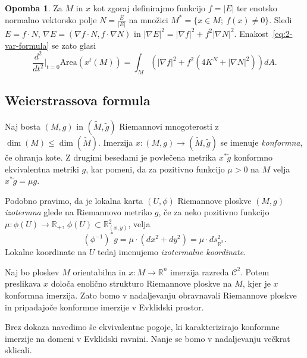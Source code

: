 \documentclass[12pt,a4paper,twoside]{article}
\theoremstyle{definition} %
\newtheorem{opomba}[definicija]{Opomba}
\theoremstyle{plain} %
\numberwithin{equation}{section}  %
\newcommand{\R}{\mathbb R}
\begin{document}
\begin{opomba}
Za $M$ in $x$ kot zgoraj definirajmo funkcijo $f = |E|$ ter enotsko normalno vektorsko polje $N = \frac{E}{|E|}$ na množici $M^{*} = \{ x \in M ; \ f(x) \neq 0 \}$. Sledi $E = f \cdot N$, $\nabla E = (\nabla f \cdot N, f \cdot \nabla N)$ in $|\nabla E|^2 = |\nabla f|^2 + f^2 |\nabla N|^2$.
Enakost~\eqref{eq:2-var-formula} se zato glasi
\begin{equation}
\frac{d^2}{dt^2} \Big|_{t=0} \text{Area} \left(x^{t}(M)\right) = \int_{M} {\left( |\nabla f|^2 + f^2 (4K^{N} + |\nabla N|^2) \right) dA}.
\end{equation}
\end{opomba}

\subsection{Weierstrassova formula}
%
Naj bosta $(M,g)$ in $(\widetilde{M},\tilde{g})$ Riemannovi mnogoterosti z $\dim(M) \leq \dim(\widetilde{M})$.
Imerzija $x \colon (M,g) \to (\widetilde{M}, \tilde{g})$ se imenuje \emph{konformna}, če ohranja kote.
Z drugimi besedami je povlečena metrika $x^{*}\tilde{g}$ konformno ekvivalentna metriki $g$, kar pomeni, da za pozitivno funkcijo $\mu > 0$ na $M$ velja $x^{*}\tilde{g} = \mu g$.

Podobno pravimo, da je lokalna karta $(U, \phi)$ Riemannove ploskve $(M,g)$ \emph{izotermna} glede na Riemannovo metriko $g$, če za neko pozitivno funkcijo $\mu \colon \phi(U) \to \mathbb{R}_{+}$, $\phi(U) \subset \mathbb{R}_{(x,y)}^2$, velja
\begin{equation}
(\phi^{-1})^{*}g = \mu \cdot (dx^2+dy^2) = \mu \cdot ds_{\mathbb{R}^2}^2.
\end{equation} 
Lokalne koordinate na $U$ tedaj imenujemo \emph{izotermalne koordinate}.

Naj bo ploskev $M$ orientabilna in $x \colon M \to \R^{n}$ imerzija razreda $\mathcal{C}^2$. Potem preslikava $x$ določa enolično strukturo Riemannove ploskve na $M$, kjer je $x$ konformna imerzija. Zato bomo v nadaljevanju obravnavali Riemannove ploskve in pripadajoče konformne imerzije v Evklidski prostor.

Brez dokaza navedimo še ekvivalentne pogoje, ki karakterizirajo konformne imerzije na domeni v Evklidski ravnini. Nanje se bomo v nadaljevanju večkrat sklicali.
\end{document}

